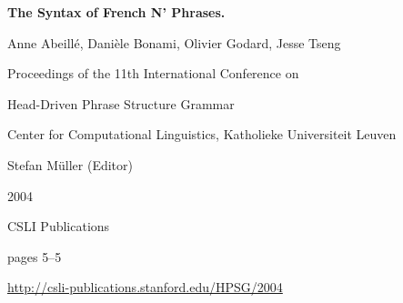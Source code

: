 \documentclass[a4paper,11pt]{article}
\begin{document}
\begin{center}
  {\huge\bf The Syntax of French N' Phrases.\par}

  \bigskip

  {\LARGE Anne Abeillé, Danièle Bonami, Olivier  Godard, Jesse Tseng\par}

  \vspace*{3\bigskipamount}

  Proceedings of the 11th International Conference on\par Head-Driven Phrase Structure Grammar

  \bigskip

  Center for Computational Linguistics, Katholieke Universiteit Leuven

  \medskip

  Stefan Müller (Editor)

  \medskip

  2004

  \medskip

  CSLI Publications

  \medskip

  pages 5--5

  \medskip

  \url{http://csli-publications.stanford.edu/HPSG/2004}
\end{center}

\newpage

        
\end{document}

